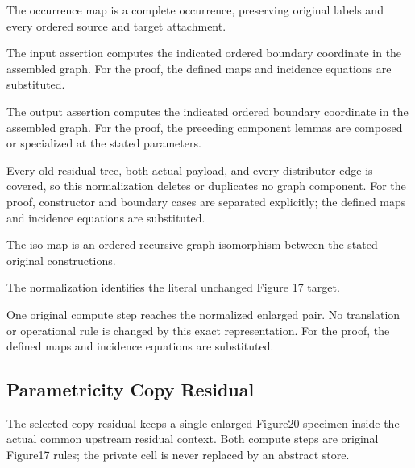 The occurrence map is a complete occurrence, preserving original labels and every ordered source and target attachment.
\par{}

The input assertion computes the indicated ordered boundary coordinate in the assembled graph.
For the proof, the defined maps and incidence equations are substituted.
\par{}

The output assertion computes the indicated ordered boundary coordinate in the assembled graph.
For the proof, the preceding component lemmas are composed or specialized at the stated parameters.
\par{}

Every old residual-tree, both actual payload, and every distributor edge is covered, so this normalization deletes or duplicates no graph component.
For the proof, constructor and boundary cases are separated explicitly; the defined maps and incidence equations are substituted.
\par{}

The iso map is an ordered recursive graph isomorphism between the stated original constructions.
\par{}

The normalization identifies the literal unchanged Figure 17 target.
\par{}

One original compute step reaches the normalized enlarged pair. No translation or operational rule is changed by this exact representation.
For the proof, the defined maps and incidence equations are substituted.
\par{}

\subsection{Parametricity Copy Residual}
The selected-copy residual keeps a single enlarged Figure20 specimen inside the actual common upstream residual context. Both compute steps are original Figure17 rules; the private cell is never replaced by an abstract store.

